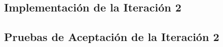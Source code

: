 

  \subsection{Implementación de la Iteración 2}



    

    \subsection{Pruebas de Aceptación de la Iteración 2}

    



